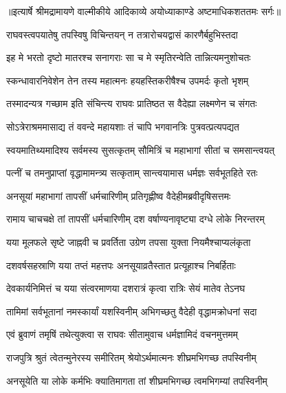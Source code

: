 {॥इत्यार्षे श्रीमद्रामायणे वाल्मीकीये आदिकाव्ये अयोध्याकाण्डे अष्टमाधिकशततमः सर्गः॥}


\twolineshloka
{राघवस्त्वपयातेषु तपस्विषु विचिन्तयन्}
{न तत्रारोचयद्वासं कारणैर्बहुभिस्तदा} %

\twolineshloka
{इह मे भरतो दृष्टो मातरश्च सनागराः}
{सा च मे स्मृतिरन्वेति तान्नित्यमनुशोचतः} %

\twolineshloka
{स्कन्धावारनिवेशेन तेन तस्य महात्मनः}
{हयहस्तिकरीषैश्च उपमर्दः कृतो भृशम्} %

\twolineshloka
{तस्मादन्यत्र गच्छाम इति संचिन्त्य राघवः}
{प्रातिष्ठत स वैदेह्या लक्ष्मणेन च संगतः} %

\twolineshloka
{सोऽत्रेराश्रममासाद्य तं ववन्दे महायशाः}
{तं चापि भगवानत्रिः पुत्रवत्प्रत्यपद्यत} %

\twolineshloka
{स्वयमातिथ्यमादिश्य सर्वमस्य सुसत्कृतम्}
{सौमित्रिं च महाभागां सीतां च समसान्त्वयत्} %

\twolineshloka
{पत्नीं च तमनुप्राप्तां वृद्धामामन्त्र्य सत्कृताम्}
{सान्त्वयामास धर्मज्ञः सर्वभूतहिते रतः} %

\twolineshloka
{अनसूयां महाभागां तापसीं धर्मचारिणीम्}
{प्रतिगृह्णीष्व वैदेहीमब्रवीदृषिसत्तमः} %

\twolineshloka
{रामाय चाचचक्षे तां तापसीं धर्मचारिणीम्}
{दश वर्षाण्यनावृष्ट्या दग्धे लोके निरन्तरम्} %

\twolineshloka
{यया मूलफले सृष्टे जाह्नवी च प्रवर्तिता}
{उग्रेण तपसा युक्ता नियमैश्चाप्यलंकृता} %

\twolineshloka
{दशवर्षसहस्राणि यया तप्तं महत्तपः}
{अनसूयाव्रतैस्तात प्रत्यूहाश्च निबर्हिताः} %

\twolineshloka
{देवकार्यनिमित्तं च यया संत्वरमाणया}
{दशरात्रं कृत्वा रात्रिः सेयं मातेव तेऽनघ} %

\twolineshloka
{तामिमां सर्वभूतानां नमस्कार्यां यशस्विनीम्}
{अभिगच्छतु वैदेही वृद्धामक्रोधनां सदा} %

\twolineshloka
{एवं ब्रुवाणं तमृषिं तथेत्युक्त्वा स राघवः}
{सीतामुवाच धर्मज्ञामिदं वचनमुत्तमम्} %

\twolineshloka
{राजपुत्रि श्रुतं त्वेतन्मुनेरस्य समीरितम्}
{श्रेयोऽर्थमात्मनः शीघ्रमभिगच्छ तपस्विनीम्} %

\twolineshloka
{अनसूयेति या लोके कर्मभिः क्यातिमागता}
{तां शीघ्रमभिगच्छ त्वमभिगम्यां तपस्विनीम्} %

